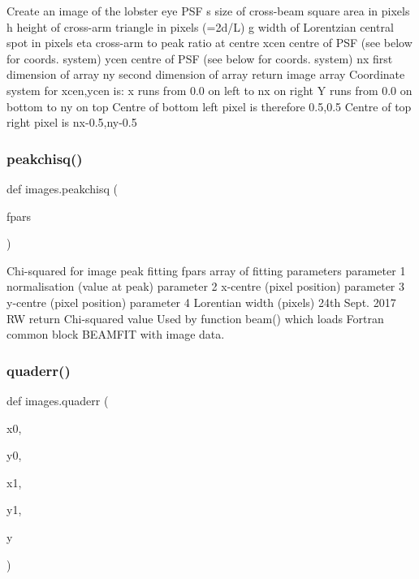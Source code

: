 \begin{DoxyVerb}Create an image of the lobster eye PSF
    s       size of cross-beam square area in pixels
    h       height of cross-arm triangle in pixels (=2d/L)
    g       width of Lorentzian central spot in pixels
    eta     cross-arm to peak ratio at centre
    xcen    centre of PSF (see below for coords. system)
    ycen    centre of PSF (see below for coords. system)
    nx      first dimension of array
    ny      second dimension of array
return  image array
    Coordinate system for xcen,ycen is:
    x runs from 0.0 on left to nx on right
    Y runs from 0.0 on bottom to ny on top
    Centre of bottom left pixel is therefore 0.5,0.5
    Centre of top right pixel is nx-0.5,ny-0.5
\end{DoxyVerb}
 \mbox{\label{namespaceimages_ae7c9d2cea3fe9a06533d6823fb7065d2}} 
\subsubsection{\texorpdfstring{peakchisq()}{peakchisq()}}
{\footnotesize\ttfamily def images.\+peakchisq (\begin{DoxyParamCaption}\item[{}]{fpars }\end{DoxyParamCaption})}

\begin{DoxyVerb}Chi-squared for image peak fitting
    fpars       array of fitting parameters
                parameter 1 normalisation (value at peak)
                parameter 2 x-centre (pixel position)
                parameter 3 y-centre (pixel position)
                parameter 4 Lorentian width (pixels) 24th Sept. 2017 RW
return      Chi-squared value
    Used by function beam() which loads Fortran common block BEAMFIT with image data.
\end{DoxyVerb}
 \mbox{\label{namespaceimages_a8faa811be5f0e7dea19b18e20bbc76e9}} 
\subsubsection{\texorpdfstring{quaderr()}{quaderr()}}
{\footnotesize\ttfamily def images.\+quaderr (\begin{DoxyParamCaption}\item[{}]{x0,  }\item[{}]{y0,  }\item[{}]{x1,  }\item[{}]{y1,  }\item[{}]{y }\end{DoxyParamCaption})}

